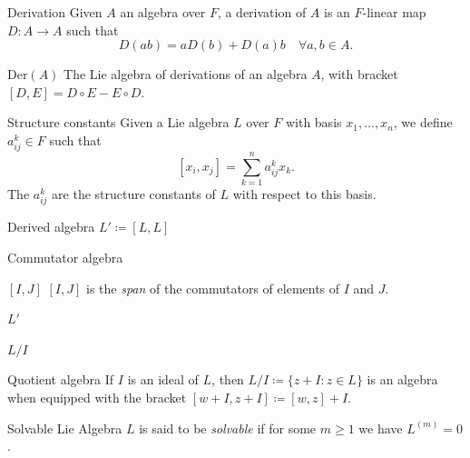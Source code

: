 \documentclass[12pt]{article}
\begin{document}
\begin{def-entry}{Derivation}
    Given $A$ an algebra over $F$, a derivation of $A$ is an $F$-linear map $D : A \to A$ such that
    $$D(ab) = aD(b) + D(a)b \hspace{1em} \forall a, b \in A.$$
\end{def-entry}

\begin{def-entry}{$\mathrm{Der}(A)$}
    The Lie algebra of derivations of an algebra $A$, with bracket $[D, E] = D\circ E - E \circ D$.
\end{def-entry}

\begin{def-entry}{Structure constants}
    Given a Lie algebra $L$ over $F$ with basis $x_1, \dots, x_n$, we define $a_{ij}^k \in F$ such that
    $$[x_i, x_j] = \sum_{k=1}^n a_{ij}^k x_k.$$
    The $a_{ij}^k$ are the structure constants of $L$ with respect to this basis.
\end{def-entry}

\begin{def-entry}{Derived algebra}
    $L' \coloneq [L, L]$
\end{def-entry}

\begin{def-entry}{Commutator algebra}
\end{def-entry}

\begin{def-entry}{$[I,J]$}
    $[I,J]$ is the \textit{span} of the commutators of elements of $I$ and $J$.
\end{def-entry}

\begin{def-entry}{$L'$}
\end{def-entry}

\begin{def-entry}{$L/I$}
\end{def-entry}

\begin{def-entry}{Quotient algebra}
    If $I$ is an ideal of $L$, then $L/I \coloneq \lbrace z + I : z \in L \rbrace$ is an algebra when equipped with the bracket $[w + I, z + I] \coloneq [w, z] + I$.
\end{def-entry}

\begin{def-entry}[solvable]{Solvable Lie Algebra}
  $L$ is said to be \textit{solvable} if for some $m \geq 1$ we have $L^{(m)} = 0$.
\end{def-entry}
\end{document}
